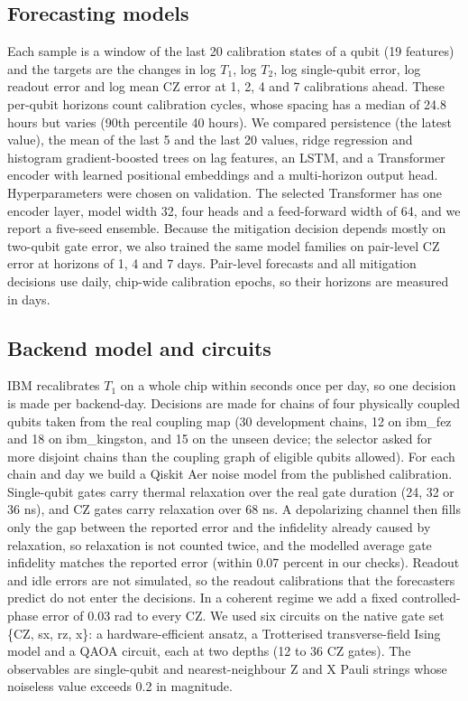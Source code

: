 \documentclass[conference]{IEEEtran}
\begin{document}
\subsection{Forecasting models}
Each sample is a window of the last 20 calibration states of a qubit (19 features) and the targets are the changes in log $T_1$, log $T_2$, log single-qubit error, log readout error and log mean CZ error at 1, 2, 4 and 7 calibrations ahead. These per-qubit horizons count calibration cycles, whose spacing has a median of 24.8 hours but varies (90th percentile 40 hours). We compared persistence (the latest value), the mean of the last 5 and the last 20 values, ridge regression and histogram gradient-boosted trees on lag features, an LSTM, and a Transformer encoder with learned positional embeddings and a multi-horizon output head. Hyperparameters were chosen on validation. The selected Transformer has one encoder layer, model width 32, four heads and a feed-forward width of 64, and we report a five-seed ensemble. Because the mitigation decision depends mostly on two-qubit gate error, we also trained the same model families on pair-level CZ error at horizons of 1, 4 and 7 days. Pair-level forecasts and all mitigation decisions use daily, chip-wide calibration epochs, so their horizons are measured in days.

\subsection{Backend model and circuits}
IBM recalibrates $T_1$ on a whole chip within seconds once per day, so one decision is made per backend-day. Decisions are made for chains of four physically coupled qubits taken from the real coupling map (30 development chains, 12 on ibm\_fez and 18 on ibm\_kingston, and 15 on the unseen device; the selector asked for more disjoint chains than the coupling graph of eligible qubits allowed). For each chain and day we build a Qiskit Aer \cite{qiskit2024} noise model from the published calibration. Single-qubit gates carry thermal relaxation over the real gate duration (24, 32 or 36 ns), and CZ gates carry relaxation over 68 ns. A depolarizing channel then fills only the gap between the reported error and the infidelity already caused by relaxation, so relaxation is not counted twice, and the modelled average gate infidelity matches the reported error (within 0.07 percent in our checks). Readout and idle errors are not simulated, so the readout calibrations that the forecasters predict do not enter the decisions. In a coherent regime we add a fixed controlled-phase error of 0.03 rad to every CZ. We used six circuits on the native gate set \{CZ, sx, rz, x\}: a hardware-efficient ansatz, a Trotterised transverse-field Ising model and a QAOA circuit, each at two depths (12 to 36 CZ gates). The observables are single-qubit and nearest-neighbour Z and X Pauli strings whose noiseless value exceeds 0.2 in magnitude.
\end{document}
